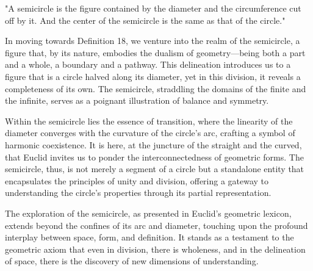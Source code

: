 
\begin{defin}
"A semicircle is the figure contained by the diameter and the circumference cut off by it. And the center of the semicircle is the same as that of the circle."
\end{defin}

In moving towards Definition 18, we venture into the realm of the semicircle, a figure that, by its nature, embodies the dualism of geometry—being both a part and a whole, a boundary and a pathway. This delineation introduces us to a figure that is a circle halved along its diameter, yet in this division, it reveals a completeness of its own. The semicircle, straddling the domains of the finite and the infinite, serves as a poignant illustration of balance and symmetry.

Within the semicircle lies the essence of transition, where the linearity of the diameter converges with the curvature of the circle's arc, crafting a symbol of harmonic coexistence. It is here, at the juncture of the straight and the curved, that Euclid invites us to ponder the interconnectedness of geometric forms. The semicircle, thus, is not merely a segment of a circle but a standalone entity that encapsulates the principles of unity and division, offering a gateway to understanding the circle's properties through its partial representation.

The exploration of the semicircle, as presented in Euclid’s geometric lexicon, extends beyond the confines of its arc and diameter, touching upon the profound interplay between space, form, and definition. It stands as a testament to the geometric axiom that even in division, there is wholeness, and in the delineation of space, there is the discovery of new dimensions of understanding.

\clearpage